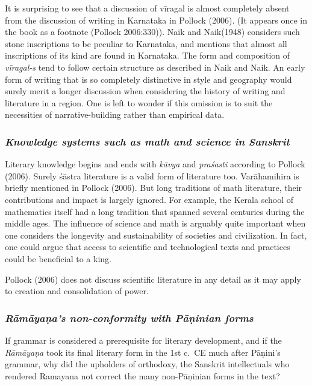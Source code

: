 It is surprising to see that a discussion of vīragal is almost completely absent from the discussion of writing in Karnataka in Pollock (2006). (It appears once in the book as a footnote (Pollock 2006:330)). Naik and Naik(1948) considers such stone inscriptions to be peculiar to Karnataka, and mentions that almost all inscriptions of its kind are found in Karnataka. The form and composition of {\sl vīragal-s} tend to follow certain structure as described in Naik and Naik. An early form of writing that is so completely distinctive in style and geography would surely merit a longer discussion when considering the history of writing and literature in a region. One is left to wonder if this omission is to suit the necessities of narrative-building rather than empirical data. 
\vskip -10pt

\subsubsection{{\sl Knowledge systems such as math and science in Sanskrit}}
\vskip -4pt

Literary knowledge begins and ends with {\sl kāvya} and {\sl praśasti} according to Pollock (2006). Surely śāstra literature is a valid form of literature too. Varāha\-mihira is briefly mentioned in Pollock (2006). But long traditions of math literature, their contributions and impact is largely ignored. For example, the Kerala school of mathematics itself had a long tradition that spanned several centuries during the middle ages. The influence of science and math is arguably quite important when one considers the longevity and sustainability of societies and civilization. In fact, one could argue that access to scientific and technological texts and practices could be beneficial to a king. 

Pollock (2006) does not discuss scientific literature in any detail as it may apply to creation and consolidation of power. 

\subsubsection{{\sl Rāmāyaṇa’s non-conformity with Pāṇinian forms}}

If grammar is considered a prerequisite for literary development, and if the {\sl Rāmāyaṇa} took its final literary form in the 1st c.\ CE much after Pāṇini’s grammar, why did the upholders of orthodoxy, the Sanskrit intellectuals who rendered Ramayana not correct the many non-Pāṇinian forms in the text? 

